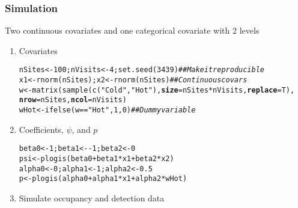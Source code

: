 \documentclass[color=usenames,dvipsnames]{beamer}\usepackage[]{graphicx}\usepackage[]{color}
\makeatletter
\newcommand{\hlnum}[1]{\textcolor[rgb]{0.69,0.494,0}{#1}}%
\newcommand{\hlstr}[1]{\textcolor[rgb]{0.749,0.012,0.012}{#1}}%
\newcommand{\hlcom}[1]{\textcolor[rgb]{0.514,0.506,0.514}{\textit{#1}}}%
\newcommand{\hlopt}[1]{\textcolor[rgb]{0,0,0}{#1}}%
\newcommand{\hlstd}[1]{\textcolor[rgb]{0,0,0}{#1}}%
\newcommand{\hlkwb}[1]{\textcolor[rgb]{0,0.341,0.682}{#1}}%
\newcommand{\hlkwc}[1]{\textcolor[rgb]{0,0,0}{\textbf{#1}}}%
\newcommand{\hlkwd}[1]{\textcolor[rgb]{0.004,0.004,0.506}{#1}}%
\newenvironment{kframe}{%
 \def\at@end@of@kframe{}%
 \ifinner\ifhmode%
  \def\at@end@of@kframe{\end{minipage}}%
  \begin{minipage}{\columnwidth}%
 \fi\fi%
 \def\FrameCommand##1{\hskip\@totalleftmargin \hskip-\fboxsep
 \colorbox{shadecolor}{##1}\hskip-\fboxsep
     \hskip-\linewidth \hskip-\@totalleftmargin \hskip\columnwidth}%
 \MakeFramed {\advance\hsize-\width
   \@totalleftmargin\z@ \linewidth\hsize
   \@setminipage}}%
 {\par\unskip\endMakeFramed%
 \at@end@of@kframe}
\newenvironment{knitrout}{}{} %
\makeatother
\begin{document}
\begin{frame}[fragile]
  \frametitle{Simulation}
  \small
  Two continuous covariates and one categorical covariate with 2 levels
  \vfill
  \begin{enumerate}[<+->]
  \item Covariates
\begin{knitrout}\scriptsize
{}\color{fgcolor}\begin{kframe}
\begin{alltt}
\hlstd{nSites} \hlkwb{<-} \hlnum{100}\hlstd{; nVisits} \hlkwb{<-} \hlnum{4}\hlstd{;} \hlkwd{set.seed}\hlstd{(}\hlnum{3439}\hlstd{)} \hlcom{## Make it reproducible}
\hlstd{x1} \hlkwb{<-} \hlkwd{rnorm}\hlstd{(nSites); x2} \hlkwb{<-} \hlkwd{rnorm}\hlstd{(nSites)}    \hlcom{## Continuous covars}
\hlstd{w} \hlkwb{<-} \hlkwd{matrix}\hlstd{(}\hlkwd{sample}\hlstd{(}\hlkwd{c}\hlstd{(}\hlstr{"Cold"}\hlstd{,} \hlstr{"Hot"}\hlstd{),} \hlkwc{size}\hlstd{=nSites}\hlopt{*}\hlstd{nVisits,} \hlkwc{replace}\hlstd{=T),}
            \hlkwc{nrow}\hlstd{=nSites,} \hlkwc{ncol}\hlstd{=nVisits)}
\hlstd{wHot} \hlkwb{<-} \hlkwd{ifelse}\hlstd{(w}\hlopt{==}\hlstr{"Hot"}\hlstd{,} \hlnum{1}\hlstd{,} \hlnum{0}\hlstd{)}            \hlcom{## Dummy variable}
\end{alltt}
\end{kframe}
\end{knitrout}
  \item Coefficients, $\psi$, and $p$
\begin{knitrout}\scriptsize
{}\color{fgcolor}\begin{kframe}
\begin{alltt}
\hlstd{beta0} \hlkwb{<-} \hlnum{1}\hlstd{; beta1} \hlkwb{<-} \hlopt{-}\hlnum{1}\hlstd{; beta2} \hlkwb{<-} \hlnum{0}
\hlstd{psi} \hlkwb{<-} \hlkwd{plogis}\hlstd{(beta0} \hlopt{+} \hlstd{beta1}\hlopt{*}\hlstd{x1} \hlopt{+} \hlstd{beta2}\hlopt{*}\hlstd{x2)}
\hlstd{alpha0} \hlkwb{<-} \hlnum{0}\hlstd{; alpha1} \hlkwb{<-} \hlnum{1}\hlstd{; alpha2} \hlkwb{<-} \hlnum{0.5}
\hlstd{p} \hlkwb{<-} \hlkwd{plogis}\hlstd{(alpha0} \hlopt{+} \hlstd{alpha1}\hlopt{*}\hlstd{x1} \hlopt{+} \hlstd{alpha2}\hlopt{*}\hlstd{wHot)}
\end{alltt}
\end{kframe}
\end{knitrout}
  \item Simulate occupancy and detection data
\begin{knitrout}\scriptsize
{}\color{fgcolor}\begin{kframe}

\end{kframe}
\end{knitrout}
\end{enumerate}
\end{frame}
\end{document}
